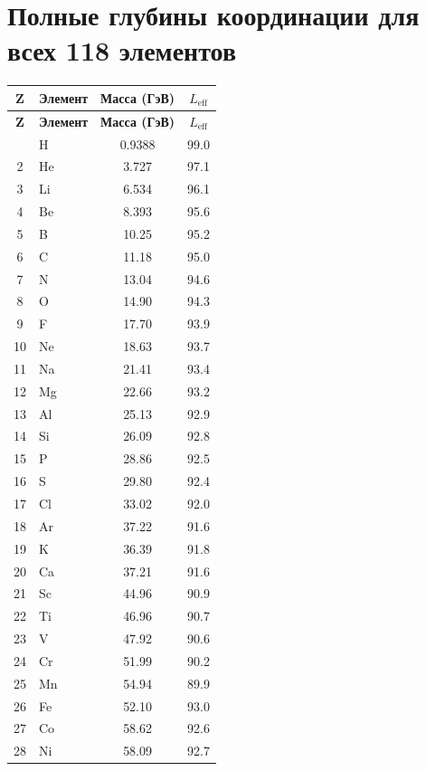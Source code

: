 \documentclass[11pt,a4paper]{article}
\begin{document}
	\section*{Полные глубины координации для всех 118 элементов}
	\label{sec:full_Leff}
	\begin{longtable}{c l c c}
		\toprule
		\textbf{Z} & \textbf{Элемент} & \textbf{Масса (ГэВ)} & \textbf{\(L_{\mathrm{eff}}\)} \\
		\midrule
		\endfirsthead
		\toprule
		\textbf{Z} & \textbf{Элемент} & \textbf{Масса (ГэВ)} & \textbf{\(L_{\mathrm{eff}}\)} \\
		\midrule
		\endhead
		\bottomrule
		\endfoot
		1  & H   & 0.9388 & 99.0 \\
		2  & He  & 3.727  & 97.1 \\
		3  & Li  & 6.534  & 96.1 \\
		4  & Be  & 8.393  & 95.6 \\
		5  & B   & 10.25  & 95.2 \\
		6  & C   & 11.18  & 95.0 \\
		7  & N   & 13.04  & 94.6 \\
		8  & O   & 14.90  & 94.3 \\
		9  & F   & 17.70  & 93.9 \\
		10 & Ne  & 18.63  & 93.7 \\
		11 & Na  & 21.41  & 93.4 \\
		12 & Mg  & 22.66  & 93.2 \\
		13 & Al  & 25.13  & 92.9 \\
		14 & Si  & 26.09  & 92.8 \\
		15 & P   & 28.86  & 92.5 \\
		16 & S   & 29.80  & 92.4 \\
		17 & Cl  & 33.02  & 92.0 \\
		18 & Ar  & 37.22  & 91.6 \\
		19 & K   & 36.39  & 91.8 \\
		20 & Ca  & 37.21  & 91.6 \\
		21 & Sc  & 44.96  & 90.9 \\
		22 & Ti  & 46.96  & 90.7 \\
		23 & V   & 47.92  & 90.6 \\
		24 & Cr  & 51.99  & 90.2 \\
		25 & Mn  & 54.94  & 89.9 \\
		26 & Fe  & 52.10  & 93.0 \\
		27 & Co  & 58.62  & 92.6 \\
		28 & Ni  & 58.09  & 92.7 \\

\end{longtable}
\end{document}
